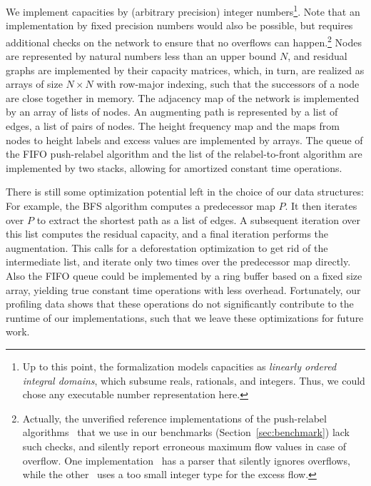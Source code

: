 \documentclass[smallcondensed]{svjour3}     %
\begin{document}
  We implement capacities by (arbitrary precision) integer numbers\footnote{Up to this point, the formalization models capacities as \emph{linearly ordered integral domains}, which subsume reals, rationals, and integers. Thus, we could chose any executable number representation here.}. Note that an implementation by fixed precision numbers would also be possible,
  but requires additional checks on the network to ensure that no overflows can happen.\footnote{Actually, the unverified reference 
  implementations of the push-relabel algorithms~\cite{Gold_Network_Opt,ICPC-notebook} that we use in our benchmarks (\cf Section~\ref{sec:benchmark}) lack such checks, and silently report erroneous maximum flow values in case of overflow. One implementation~\cite{ICPC-notebook} has a parser that silently ignores overflows, 
  while the other~\cite{Gold_Network_Opt} uses a too small integer type for the excess flow.}
  Nodes are represented by natural numbers less than an upper bound $N$, and residual graphs are implemented by their capacity matrices, which, in turn,
  are realized as arrays of size $N\times N$ with row-major indexing, such that the successors of a node are close together in memory.
  The adjacency map of the network is implemented by an array of lists of nodes. 
  An augmenting path is represented by a list of edges, \ie a list of pairs of nodes. 
  The height frequency map and the maps from nodes to height labels and excess values are implemented by arrays.
  The queue of the FIFO push-relabel algorithm and the list of the relabel-to-front algorithm are implemented by two stacks, allowing for amortized constant time operations.

  There is still some optimization potential left in the choice of our data structures: 
  For example, the BFS algorithm computes a predecessor map $P$. It then iterates over $P$ to extract the shortest path as a list of edges.
  A subsequent iteration over this list computes the residual capacity, and a final iteration performs the augmentation. 
  This calls for a deforestation optimization to get rid of the intermediate list, and iterate only two times over the predecessor map directly.
  Also the FIFO queue could be implemented by a ring buffer based on a fixed size array, yielding true constant time operations with less overhead.
  Fortunately, our profiling data shows that these operations do not significantly contribute to the runtime of our implementations, such that 
  we leave these optimizations for future work.
  
\end{document}
